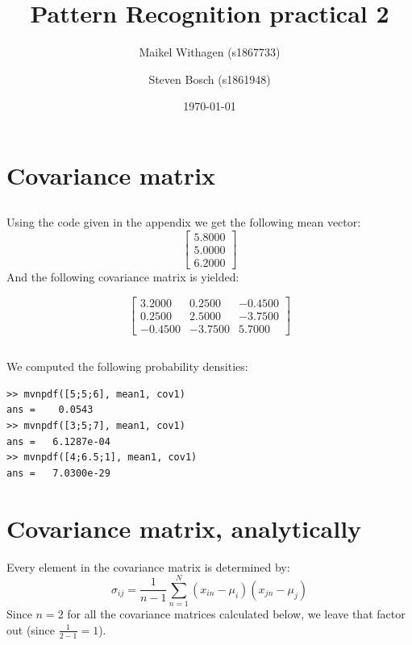 \documentclass[10pt]{article}
\title{Pattern Recognition practical 2}
\author{Maikel Withagen (s1867733) \and Steven Bosch (s1861948)}
\date{\today}
\begin{document}
\maketitle

\section{Covariance matrix}
\subsection{}
Using the code given in the appendix we get the following mean vector:
\begin{equation}
    \begin{bmatrix}
      5.8000 \\
      5.0000 \\
      6.2000
    \end{bmatrix}
\end{equation}
And the following covariance matrix is yielded:

  \begin{equation}
    \begin{bmatrix}
      3.2000  &  0.2500 &  -0.4500 \\
      0.2500  &  2.5000 &  -3.7500 \\
    -0.4500 &  -3.7500 &   5.7000
    \end{bmatrix}
\end{equation}

\subsection{}
We computed the following probability densities:
\begin{lstlisting}
>> mvnpdf([5;5;6], mean1, cov1)
ans =    0.0543
>> mvnpdf([3;5;7], mean1, cov1)
ans =   6.1287e-04
>> mvnpdf([4;6.5;1], mean1, cov1)
ans =   7.0300e-29
\end{lstlisting}

\section{Covariance matrix, analytically}
Every element in the covariance matrix is determined by:
\begin{equation}
\sigma_{ij} = \frac{1}{n-1} \sum_{n=1}^{N} (x_{in}-\mu_{i})(x_{jn} - \mu_{j})
\end{equation}
Since $n=2$ for all the covariance matrices calculated below, we leave that factor out (since $\frac{1}{2-1}=1$).
\end{document}
